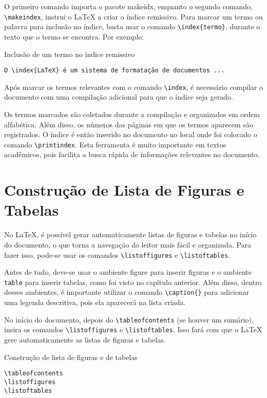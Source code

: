 \noindent O primeiro comando importa o pacote makeidx, enquanto o segundo comando, \verb|\makeindex|, instrui o \LaTeX{} a criar o índice remissivo. Para marcar um termo ou palavra para inclusão no índice, basta usar o comando \verb|\index{termo}|, durante o texto que o termo se encontra. Por exemplo:

\begin{trailer}{Inclusão de um termo no \'indice remissivo}
\begin{verbatim} 
O \index{LaTeX} é um sistema de formatação de documentos ...\end{verbatim}
\end{trailer}

\noindent Após marcar os termos relevantes com o comando \verb|\index|, é necessário compilar o documento com uma compilação adicional para que o índice seja gerado.

\noindent Os termos marcados são coletados durante a compilação e organizados em ordem alfabética. Além disso, os números das páginas em que os termos aparecem são registrados. O índice é então inserido no documento no local onde foi colocado o comando \verb|\printindex|. Esta ferramenta é muito importante em textos acadêmicos, pois facilita a busca rápida de informações relevantes no documento.

\section{Constru\c c\~ao de Lista de Figuras e Tabelas}
\label{sec:3}

No \LaTeX{}, é possível gerar automaticamente listas de figuras e tabelas no início do documento, o que torna a navegação do leitor mais fácil e organizada. Para fazer isso, pode-se usar os comandos \verb|\listoffigures| e \verb|\listoftables|. 

\noindent Antes de tudo, deve-se usar o ambiente figure para inserir figuras e o ambiente \verb|table| para inserir tabelas, como foi visto no capítulo anterior. Além disso, dentro desses ambientes, é importante utilizar o comando \verb|\caption{}| para adicionar uma legenda descritiva, pois ela aparecerá na lista criada.

\noindent No início do documento, depois do \verb|\tableofcontents| (se houver um sumário), insira os comandos \verb|\listoffigures| e \verb|\listoftables|. Isso fará com que o \LaTeX{} gere automaticamente as listas de figuras e tabelas.

\begin{trailer}{Construção de lista de figuras e de tabelas}
\begin{verbatim} 
\tableofcontents
\listoffigures
\listoftables \end{verbatim}
\end{trailer}

